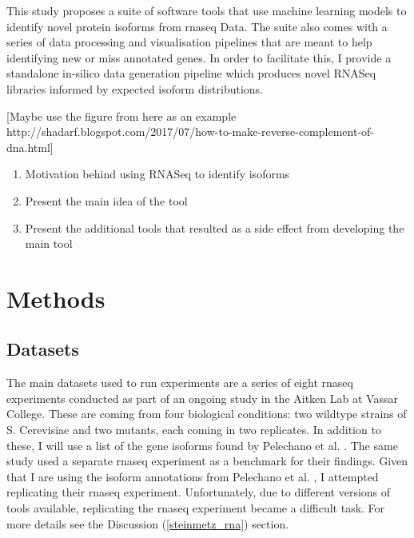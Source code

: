 \documentclass[12pt]{article}
\begin{document}
This study proposes a suite of software tools that use machine learning models to identify novel protein isoforms from \gls{rnaseq} Data. The suite also comes with a series of data processing and visualisation pipelines that are meant to help identifying new or miss annotated genes. In order to facilitate this, I provide a standalone in-silico data generation pipeline which produces novel RNASeq libraries informed by expected isoform distributions. 

[Maybe use the figure from here as an example http://shadarf.blogspot.com/2017/07/how-to-make-reverse-complement-of-dna.html]


\begin{enumerate}
  
    \item Motivation behind using RNASeq to identify isoforms
    \item Present the main idea of the tool
    \item Present  the additional tools that resulted as a side effect from developing the main tool

\end{enumerate}


\section{Methods}
\subsection{Datasets}\label{datasets}

The main datasets used to run experiments are a series of eight \acrshort{rnaseq} experiments conducted as part of an ongoing study in the Aitken Lab at Vassar College. These are coming from four biological conditions: two wildtype strains of S. Cerevisiae and two mutants, each coming in two replicates. In addition to these, I will use a list of the gene isoforms found by Pelechano et al. \cite{Pelechano2013}. The same study \cite{Pelechano2013} used a separate \cite{Wilkening2013}  \acrshort{rnaseq} experiment as a benchmark for their findings. Given that I are using the isoform annotations from Pelechano et al. \cite{Pelechano2013}, I attempted replicating their \acrshort{rnaseq} experiment. Unfortunately, due to different versions of tools available, replicating the \acrshort{rnaseq} experiment became a difficult task. For more details see the Discussion (\ref{steinmetz_rna}) section. 
\end{document}
